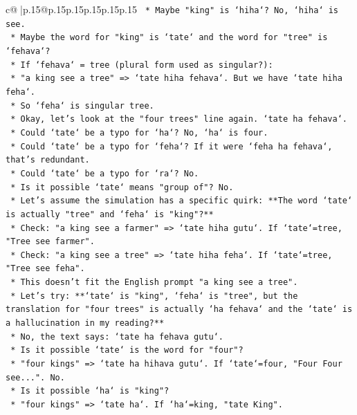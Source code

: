 \documentclass{article}
\begin{document}
{\begin{supertabular}{c@{$\;$}|p{.15\linewidth}@{}p{.15\linewidth}p{.15\linewidth}p{.15\linewidth}p{.15\linewidth}p{.15\linewidth}}
{{{\texttt{        *   Maybe "king" is `hiha`? No, `hiha` is see.} \\
\texttt{        *   Maybe the word for "king" is `tate` and the word for "tree" is `fehava`?} \\
\texttt{        *   If `fehava` = tree (plural form used as singular?):} \\
\texttt{            *   "a king see a tree" => `tate hiha fehava`. But we have `tate hiha feha`.} \\
\texttt{            *   So `feha` is singular tree.} \\
\texttt{        *   Okay, let's look at the "four trees" line again. `tate ha fehava`.} \\
\texttt{        *   Could `tate` be a typo for `ha`? No, `ha` is four.} \\
\texttt{        *   Could `tate` be a typo for `feha`? If it were `feha ha fehava`, that's redundant.} \\
\texttt{        *   Could `tate` be a typo for `ra`? No.} \\
\texttt{        *   Is it possible `tate` means "group of"? No.} \\
\texttt{        *   Let's assume the simulation has a specific quirk: **The word `tate` is actually "tree" and `feha` is "king"?**} \\
\texttt{            *   Check: "a king see a farmer" => `tate hiha gutu`. If `tate`=tree, "Tree see farmer".} \\
\texttt{            *   Check: "a king see a tree" => `tate hiha feha`. If `tate`=tree, "Tree see feha".} \\
\texttt{            *   This doesn't fit the English prompt "a king see a tree".} \\
\texttt{        *   Let's try: **`tate` is "king", `feha` is "tree", but the translation for "four trees" is actually `ha fehava` and the `tate` is a hallucination in my reading?**} \\
\texttt{        *   No, the text says: `tate ha fehava gutu`.} \\
\texttt{        *   Is it possible `tate` is the word for "four"?} \\
\texttt{            *   "four kings" => `tate ha hihava gutu`. If `tate`=four, "Four Four see...". No.} \\
\texttt{        *   Is it possible `ha` is "king"?} \\
\texttt{            *   "four kings" => `tate ha`. If `ha`=king, "tate King".} \\
}}}
\end{supertabular}}
\end{document}
